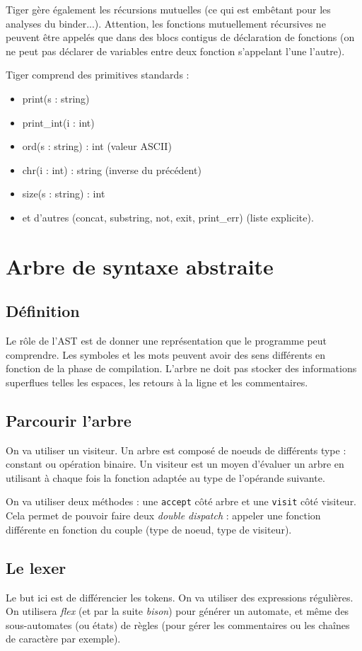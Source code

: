 \documentclass{article}
\begin{document}
Tiger gère également les récursions mutuelles (ce qui est embêtant pour les analyses du binder...). Attention, les fonctions mutuellement récursives ne peuvent être appelés que dans des blocs contigus de déclaration de fonctions (on ne peut pas déclarer de variables entre deux fonction s'appelant l'une l'autre).

Tiger comprend des primitives standards :
\begin{itemize}
\item print(s : string)
\item print\_int(i : int)
\item ord(s : string) : int (valeur ASCII)
\item chr(i : int) : string (inverse du précédent)
\item size(s : string) : int
\item et d'autres (concat, substring, not, exit, print\_err) (liste explicite).
\end{itemize}


\section{Arbre de syntaxe abstraite}

\subsection{Définition}
Le rôle de l'AST est de donner une représentation que le programme peut comprendre. Les symboles et les mots peuvent avoir des sens différents en fonction de la phase de compilation. L'arbre ne doit pas stocker des informations superflues telles les espaces, les retours à la ligne et les commentaires.


\subsection{Parcourir l'arbre}
On va utiliser un visiteur. Un arbre est composé de noeuds de différents type : constant ou opération binaire. Un visiteur est un moyen d'évaluer un arbre en utilisant à chaque fois la fonction adaptée au type de l'opérande suivante.

On va utiliser deux méthodes : une \texttt{accept} côté arbre et une \texttt{visit} côté visiteur. Cela permet de pouvoir faire deux \emph{double dispatch} : appeler une fonction différente en fonction du couple (type de noeud, type de visiteur).

\subsection{Le lexer}
Le but ici est de différencier les tokens. On va utiliser des expressions régulières. On utilisera \emph{flex} (et par la suite \emph{bison}) pour générer un automate, et même des sous-automates (ou états) de règles (pour gérer les commentaires ou les chaînes de caractère par exemple).
\end{document}
